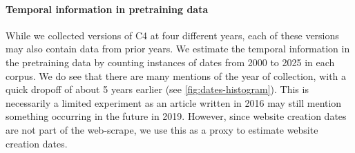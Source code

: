 \documentclass{article}
\begin{document}
\vspace{-3mm}
\paragraph {Temporal information in pretraining data} 
While we collected versions of C4 at four different years, each of these versions may also contain data from prior years. 
We estimate the temporal information in the pretraining data by counting instances of dates from 2000 to 2025 in each corpus. 
We do see that there are many mentions of the year of collection, with a quick dropoff of about 5 years earlier (see \cref{fig:dates-histogram}). 
This is necessarily a limited experiment as an article written in 2016 may still mention something occurring in the future in 2019. 
However, since website creation dates are not part of the web-scrape, we use this as a proxy to estimate website creation dates. 
\end{document}
